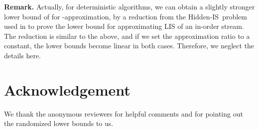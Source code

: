 \documentclass{llncs}
\newcommand{\runtitle}[1]{{\small \textbf{\boldmath #1}}}
\newcommand{\hlis}{{\sc Hidden-IS}}
\begin{document}
\runtitle{Remark.} Actually, for deterministic algorithms, we can obtain a
slightly stronger lower bound of  for -approximation, by
a reduction from the \hlis~problem used in \cite{GaG07} to prove the
 lower bound for approximating LIS of an in-order stream.  The
reduction is similar to the above, and if we set the approximation ratio
 to a constant, the lower bounds become linear in both cases.  Therefore, we
neglect the details here.



\section*{Acknowledgement}
We thank the anonymous reviewers for helpful comments and for pointing out the
randomized lower bounds to us.
\end{document}
